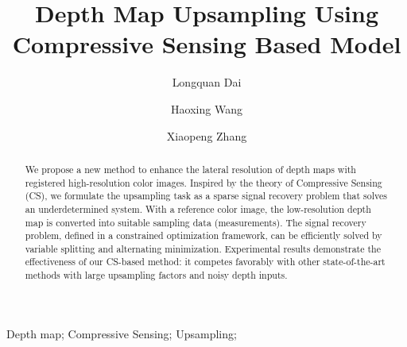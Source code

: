 \documentclass[preprint,10pt,5p,times,twocolumn]{elsarticle}
\begin{document}
\begin{frontmatter}



\title{Depth Map Upsampling Using Compressive Sensing Based Model}


\author[nlpr]{Longquan Dai}

\author[nlpr]{Haoxing Wang}

\author[nlpr]{Xiaopeng Zhang}

\address[nlpr]{National Laboratory of Pattern Recognition\\ Institute of Automation Chinese Academy of Sciences\\95 Zhongguancun East Road Beijing China}


\begin{abstract}
We propose a new method to enhance the lateral resolution of depth maps with registered high-resolution color images. Inspired by the theory of Compressive Sensing (CS), we formulate the upsampling task as a sparse signal recovery problem that solves an underdetermined system. With a reference color image, the low-resolution depth map is converted into suitable sampling data (measurements). The signal recovery problem, defined in a constrained optimization framework, can be efficiently solved by variable splitting and alternating minimization. Experimental results demonstrate the effectiveness of our CS-based method: it competes favorably with other state-of-the-art methods with large upsampling factors and noisy depth inputs.
\end{abstract}

\begin{keyword}

Depth map; Compressive Sensing; Upsampling;

\end{keyword}

\end{frontmatter}
\end{document}
